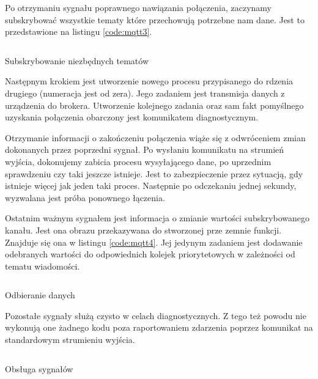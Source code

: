         Po otrzymaniu sygnału poprawnego nawiązania połączenia, zaczynamy subskrybować wszystkie tematy które przechowują potrzebne nam dane. Jest to przedstawione na listingu \ref{code:mqtt3}.
          
        \begin{kod}
            \inputminted[firstline=14, lastline=19]{cpp}{esp/listings/mqtt.cpp}
            \caption{Subskrybowanie niezbędnych tematów}
            \label{code:mqtt3}
            \vspace{2em}
        \end{kod}
        
        
        
        Następnym krokiem jest utworzenie nowego procesu przypisanego do rdzenia drugiego (numeracja jest od zera). Jego zadaniem jest transmisja danych z urządzenia do brokera. Utworzenie kolejnego zadania oraz sam fakt pomyślnego uzyskania połączenia obarczony jest komunikatem diagnostycznym.
        
        Otrzymanie informacji o zakończeniu połączenia wiąże się z odwróceniem zmian dokonanych przez poprzedni sygnał. Po wysłaniu komunikatu na strumień wyjścia, dokonujemy zabicia procesu wysyłającego dane, po uprzednim sprawdzeniu czy taki jeszcze istnieje. Jest to zabezpieczenie przez sytuacją, gdy istnieje więcej jak jeden taki proces. Następnie po odczekaniu jednej sekundy, wyzwalana jest próba ponownego łączenia. 
        
        Ostatnim ważnym sygnałem jest informacja o zmianie wartości subskrybowanego kanału. Jest ona obrazu  przekazywana do stworzonej prze zemnie funkcji. Znajduje się ona w listingu \ref{code:mqtt4}. Jej jedynym zadaniem jest dodawanie odebranych wartości do odpowiednich kolejek priorytetowych w zależności od tematu wiadomości. 
     
        \begin{kod}
            \inputminted[firstline=21, lastline=44]{cpp}{esp/listings/mqtt.cpp}
            \caption{Odbieranie danych}
            \label{code:mqtt4}
            \vspace{2em}
        \end{kod}
        
           
           
        Pozostałe sygnały służą czysto w celach diagnostycznych. Z tego też powodu nie wykonują one żadnego kodu poza raportowaniem zdarzenia poprzez komunikat na standardowym strumieniu wyjścia.  
        
        \begin{kod}
            \inputminted[firstline=73, lastline=125]{cpp}{esp/listings/mqtt.cpp}
            \caption{Obsługa sygnałów}
            \label{code:mqtt5}
            \vspace{2em}
        \end{kod}
        
